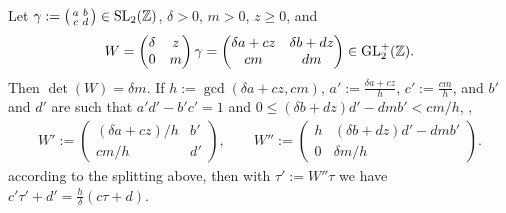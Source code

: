 \documentclass{article}
\begin{document}
\begingroup
\newcommand{\h}{h}
\begin{Lemma}\label{thm:c*tau+d}
  Let $\gamma := \left(
    \begin{smallmatrix}a&b\\c&d\end{smallmatrix} \right)\in
  \SL2Z$, $\delta>0$, $m>0$, $z\ge0$, and
  \begin{gather*}
    W=
    \begin{pmatrix}
      \delta & z\\
      0      & m
    \end{pmatrix}
    \gamma
    = \begin{pmatrix}
        \delta a + c z & \delta b + d z\\
        c m & d m
      \end{pmatrix}
    \in \mathrm{GL}_2^+(\mathbb{Z}).
  \end{gather*}
  Then $\det(W)=\delta m$.
  If
  $\h:=\gcd(\delta a + c z, cm)$,
  $a':=\frac{\delta a + c z}{\h}$,
  $c':=\frac{c m}{\h}$, and
  $b'$ and $d'$ are such that $a'd'-b'c'=1$ and
  $0 \le (\delta b + d z) d' - d m b' < cm / \h$, \ie,
  \begin{gather*}
    W':=\begin{pmatrix}
      (\delta a + c z) / \h & b'\\
      c m / \h              & d'
    \end{pmatrix},
    \qquad
    W''
    :=
    \begin{pmatrix}
      \h & (\delta b + d z) d' - d m b'\\
      0  & \delta m / \h
    \end{pmatrix}.
  \end{gather*}
  according to the splitting above,
  then with $\tau':=W''\tau$ we have
  $c'\tau'+d' = \frac{\h}{\delta} (c\tau + d)$.
\end{Lemma}
\end{document}
